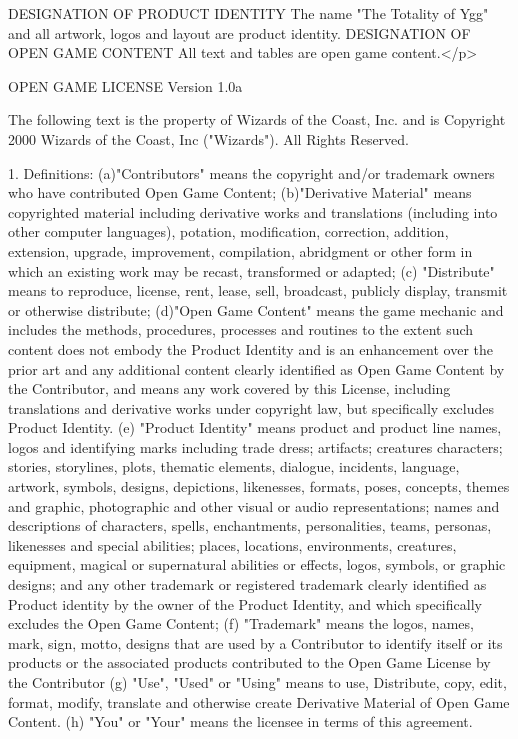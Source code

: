 {


\pagebreak


DESIGNATION OF PRODUCT IDENTITY
The name "The Totality of Ygg" and all artwork, logos and layout are product identity. DESIGNATION OF OPEN GAME CONTENT All text and tables are open game content.</p>

OPEN GAME LICENSE Version 1.0a

The following text is the property of Wizards of the Coast, Inc. and is Copyright 2000 Wizards of the Coast, Inc ("Wizards"). All Rights Reserved.

1. Definitions: (a)"Contributors" means the copyright and/or trademark owners who have contributed Open Game Content; (b)"Derivative Material" means copyrighted material including derivative works and translations (including into other computer languages), potation, modification, correction, addition, extension, upgrade, improvement, compilation, abridgment or other form in which an existing work may be recast, transformed or adapted; (c) "Distribute" means to reproduce, license, rent, lease, sell, broadcast, publicly display, transmit or otherwise distribute; (d)"Open Game Content" means the game mechanic and includes the methods, procedures, processes and routines to the extent such content does not embody the Product Identity and is an enhancement over the prior art and any additional content clearly identified as Open Game Content by the Contributor, and means any work covered by this License, including translations and derivative works under copyright law, but specifically excludes Product Identity. (e) "Product Identity" means product and product line names, logos and identifying marks including trade dress; artifacts; creatures characters; stories, storylines, plots, thematic elements, dialogue, incidents, language, artwork, symbols, designs, depictions, likenesses, formats, poses, concepts, themes and graphic, photographic and other visual or audio representations; names and descriptions of characters, spells, enchantments, personalities, teams, personas, likenesses and special abilities; places, locations, environments, creatures, equipment, magical or supernatural abilities or effects, logos, symbols, or graphic designs; and any other trademark or registered trademark clearly identified as Product identity by the owner of the Product Identity, and which specifically excludes the Open Game Content; (f) "Trademark" means the logos, names, mark, sign, motto, designs that are used by a Contributor to identify itself or its products or the associated products contributed to the Open Game License by the Contributor (g) "Use", "Used" or "Using" means to use, Distribute, copy, edit, format, modify, translate and otherwise create Derivative Material of Open Game Content. (h) "You" or "Your" means the licensee in terms of this agreement.
}
